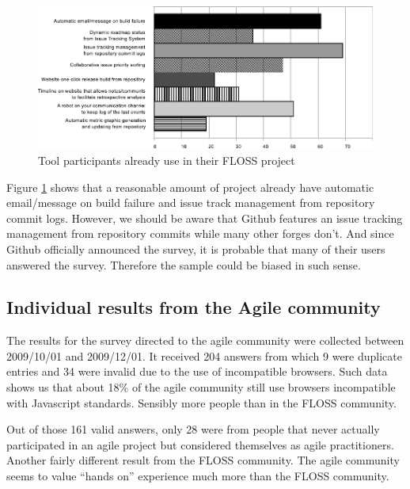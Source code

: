 \documentclass[lnbip]{svmultln}
\begin{document}
\begin{figure}[hbt]
  \centering
  \includegraphics[scale=.8]{floss-existingtools.pdf}
  \caption{Tool participants already use in their FLOSS project}
  \label{fig:floss-existingtools}
\end{figure}

Figure \ref{fig:floss-existingtools} shows that a reasonable amount of
project already have automatic email/message on build failure and
issue track management from repository commit logs.  However, we
should be aware that Github features an issue tracking management from
repository commits while many other forges don't. And since Github
officially announced the survey, it is probable that many of their
users answered the survey. Therefore the sample could be biased in
such sense.

\subsection{Individual results from the Agile community}
\label{subsec:agile-results}

The results for the survey directed to the agile community were
collected between 2009/10/01 and 2009/12/01. It received 204 answers
from which 9 were duplicate entries and 34 were invalid due to the use
of incompatible browsers. Such data shows us that about 18\% of the
agile community still use browsers incompatible with Javascript
standards. Sensibly more people than in the FLOSS community.

Out of those 161 valid answers, only 28 were from people that never
actually participated in an agile project but considered themselves as
agile practitioners. Another fairly different result from the FLOSS
community. The agile community seems to value ``hands on'' experience
much more than the FLOSS community.
\end{document}
